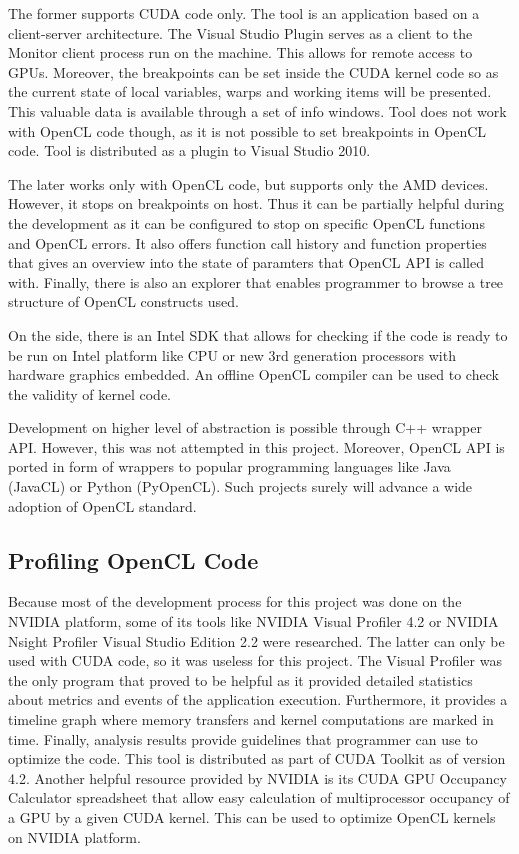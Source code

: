 The former supports CUDA code only. The tool is an application based on a client-server architecture.  The Visual Studio Plugin serves as a client to the Monitor client process run on the machine. This allows for remote access to GPUs. Moreover, the breakpoints can be set inside the CUDA kernel code so as the current state of local variables, warps and working items will be presented. This valuable data is available through a set of info windows. Tool does not work with OpenCL code though, as it is not possible to set breakpoints in OpenCL code. Tool is distributed as a plugin to Visual Studio 2010.

The later works only with OpenCL code, but supports only the AMD devices. However, it stops on breakpoints on host. Thus it can be partially helpful during the development as it can be configured to stop on specific OpenCL functions and OpenCL errors. It also offers function call history and function properties that gives an overview into the state of paramters that OpenCL API is called with. Finally, there is also an explorer that enables programmer to browse a tree structure of OpenCL constructs used.

On the side, there is an Intel SDK that allows for checking if the code is ready to be run on Intel platform like CPU or new 3rd generation processors with hardware graphics embedded. An offline OpenCL compiler can be used to check the validity of kernel code. 

Development on higher level of abstraction is possible through C++ wrapper API. However, this was not attempted in this project. Moreover, OpenCL API is ported in form of wrappers to popular programming languages like Java (JavaCL) or Python (PyOpenCL). Such projects surely will advance a wide adoption of OpenCL standard. 

\subsection{Profiling OpenCL Code}
Because most of the development process for this project was done on the NVIDIA platform, some of its tools like NVIDIA Visual Profiler 4.2 or NVIDIA Nsight Profiler Visual Studio Edition 2.2 were researched. The latter can only be used with CUDA code, so it was useless for this project. The Visual Profiler was the only program that proved to be helpful as it provided detailed statistics about metrics and events of the application execution. Furthermore, it provides a timeline graph where memory transfers and kernel computations are marked in time. Finally, analysis results provide guidelines that programmer can use to optimize the code. This tool is distributed as part of CUDA Toolkit as of version 4.2. 
Another helpful resource provided by NVIDIA is its CUDA GPU Occupancy Calculator spreadsheet that allow easy calculation of multiprocessor occupancy of a GPU by a given CUDA kernel. This can be used to optimize OpenCL kernels on NVIDIA platform.

